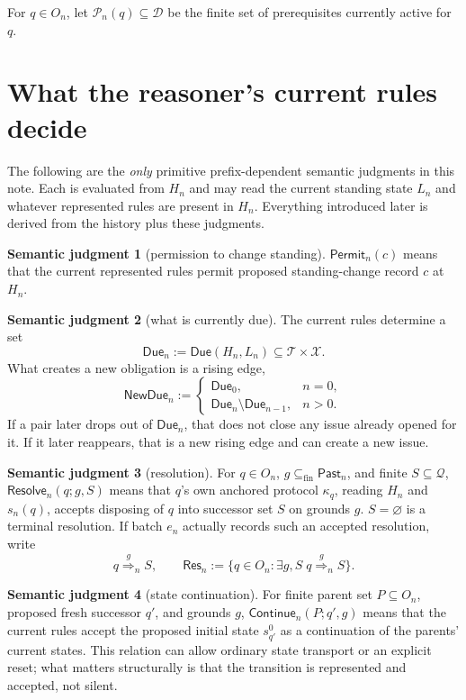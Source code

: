 \documentclass[11pt]{article}
\theoremstyle{definition}
\newtheorem*{semantics}{Semantic judgment}
\theoremstyle{remark}
\newcommand{\fin}{\subseteq_{\mathrm{fin}}}
\newcommand{\Past}{\mathsf{Past}}
\newcommand{\Permit}{\mathsf{Permit}}
\newcommand{\Due}{\mathsf{Due}}
\newcommand{\NewDue}{\mathsf{NewDue}}
\newcommand{\Resolve}{\mathsf{Resolve}}
\newcommand{\Continue}{\mathsf{Continue}}
\newcommand{\Pre}{\mathcal P}
\newcommand{\ResSet}{\mathsf{Res}}
\newcommand{\res}[2]{\overset{#1}{\Longrightarrow}_{#2}}
\begin{document}
For $q\in O_n$, let $\Pre_n(q)\subseteq\mathcal D$ be the finite set of
prerequisites currently active for $q$.

\section{What the reasoner's current rules decide}\label{sec:semantics}

The following are the \emph{only} primitive prefix-dependent semantic
judgments in this note. Each is evaluated from $H_n$ and may read the current
standing state $L_n$ and whatever represented rules are present in $H_n$.
Everything introduced later is derived from the history plus these judgments.

\begin{semantics}[permission to change standing]
$\Permit_n(c)$ means that the current represented rules permit proposed
standing-change record $c$ at $H_n$.
\end{semantics}

\begin{semantics}[what is currently due]
The current rules determine a set
\[
 \Due_n:=\Due(H_n,L_n)\subseteq\mathcal T\times\mathcal X.
\]
What creates a new obligation is a rising edge,
\[
 \NewDue_n:=
 \begin{cases}
   \Due_0,&n=0,\\
   \Due_n\setminus\Due_{n-1},&n>0.
 \end{cases}
\]
If a pair later drops out of $\Due_n$, that does not close any issue already
opened for it. If it later reappears, that is a new rising edge and can create
a new issue.
\end{semantics}

\begin{semantics}[resolution]
For $q\in O_n$, $g\fin\Past_n$, and finite $S\subseteq\mathcal Q$,
$\Resolve_n(q;g,S)$ means that $q$'s own anchored protocol $\kappa_q$, reading
$H_n$ and $s_n(q)$, accepts disposing of $q$ into successor set $S$ on grounds
$g$. $S=\varnothing$ is a terminal resolution. If batch $e_n$ actually records
such an accepted resolution, write
\[
 q\res{g}{n}S,
 \qquad
 \ResSet_n:=\{q\in O_n:\exists g,S\;q\res{g}{n}S\}.
\]
\end{semantics}

\begin{semantics}[state continuation]
For finite parent set $P\subseteq O_n$, proposed fresh successor $q'$, and
grounds $g$, $\Continue_n(P;q',g)$ means that the current rules accept the
proposed initial state $s_{q'}^0$ as a continuation of the parents' current
states. This relation can allow ordinary state transport or an explicit reset;
what matters structurally is that the transition is represented and accepted,
not silent.
\end{semantics}
\end{document}
